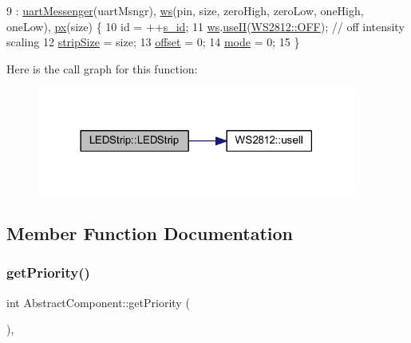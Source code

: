 \begin{DoxyCode}
9                                : \hyperlink{class_l_e_d_strip_a4387042fe2a80bcd5dc3e9d7524800ae}{uartMessenger}(uartMsngr), \hyperlink{class_l_e_d_strip_a81c4bffd481d09defe63642c9e69ed17}{ws}(pin, size, zeroHigh, zeroLow, 
      oneHigh, oneLow), \hyperlink{class_l_e_d_strip_aa8a8764862dbb64aedc0b53cfe3fc22b}{px}(size) \{
10     \textcolor{keywordtype}{id} = ++\hyperlink{class_abstract_component_a99ce3e5fe7d73dac569b874c15fcaf0d}{s\_id};
11     \hyperlink{class_l_e_d_strip_a81c4bffd481d09defe63642c9e69ed17}{ws}.\hyperlink{class_w_s2812_acb221ea7ba9cfb40a43b7778f0dffa5d}{useII}(\hyperlink{class_w_s2812_a14186f70863bf4f3a35b2cc21b15642da3937d959838b5887619b403a2f717d55}{WS2812::OFF}); \textcolor{comment}{// off intensity scaling}
12     \hyperlink{class_l_e_d_strip_af1987ffe7252fa35b42ad3698c3de454}{stripSize} = size;
13     \hyperlink{class_l_e_d_strip_a37a3616a79fe3dda93c145d14543199c}{offset} = 0;
14     \hyperlink{class_l_e_d_strip_ac209f99d6a633cd4c672fc16a991f4f8}{mode} = 0;
15 \}
\end{DoxyCode}
Here is the call graph for this function\+:\nopagebreak
\begin{figure}[H]
\begin{center}
\leavevmode
\includegraphics[width=297pt]{class_l_e_d_strip_a746e420e05c5d6c45eb2f74eaf5928fc_cgraph}
\end{center}
\end{figure}


\subsection{Member Function Documentation}
\mbox{\label{class_abstract_component_ac0b440d1d642ff1292ec3c544d75a8f1}} 
\subsubsection{\texorpdfstring{get\+Priority()}{getPriority()}}
{\footnotesize\ttfamily int Abstract\+Component\+::get\+Priority (\begin{DoxyParamCaption}{ }\end{DoxyParamCaption})\hspace{0.3cm}{\ttfamily [inline]}, {\ttfamily [inherited]}}

